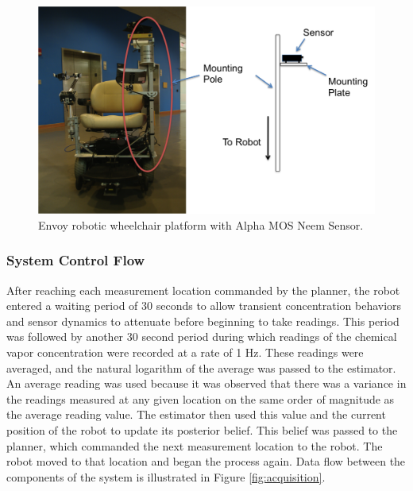 \documentclass[submit, 12pt]{aiaa-pretty-modified}
\begin{document}
\begin{figure}
\begin{center}
\includegraphics[width=5in]{img/wheelchair.pdf}
\caption{Envoy robotic wheelchair platform with Alpha MOS Neem Sensor.}
\label{fig:wheelchair}
\end{center}
\end{figure}

\FloatBarrier

\label{sec:mount}

\subsubsection{System Control Flow}

After reaching each measurement location commanded by the planner, the robot
entered a waiting period of 30 seconds to allow transient concentration
behaviors and sensor dynamics to attenuate before beginning to take readings.
This period was followed by another 30 second period during which readings of
the chemical vapor concentration were recorded at a rate of 1 Hz. These readings
were averaged, and the natural logarithm of the average was passed to the
estimator. An average reading was used because it was observed that
there was a variance in the readings measured at any given location on the
same order of magnitude as the average reading value. The estimator then used
this value and the current position of the robot to update its posterior belief.
This belief was passed to the planner, which commanded the next measurement
location to the robot. The robot moved to that location and began the process
again. Data flow between the components of the system is illustrated in Figure
\ref{fig:acquisition}.
\end{document}
